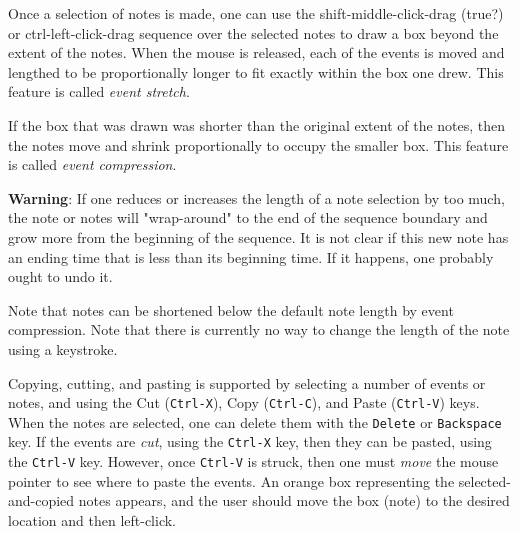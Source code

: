    Once a selection of notes is made, one can use the
   shift-middle-click-drag (true?) or ctrl-left-click-drag
   sequence over the selected notes to
   draw a box beyond the extent of the notes.  When the mouse is released,
   each of the events is moved and lengthed to be proportionally longer to
   fit exactly within the box one drew.
   This feature is called \textsl{event stretch}.

   If the box that was drawn was shorter than the original extent of the
   notes, then the notes move and shrink proportionally to occupy the
   smaller box.
   This feature is called \textsl{event compression}.
   
   \textbf{Warning}:  If one reduces or increases the length of a note selection
   by too much, the note or notes will "wrap-around" to the end of the sequence
   boundary and grow more from the beginning of the sequence. 
   It is not clear if this new note has an ending time that is less than its
   beginning time.  If it happens, one probably ought to undo it.

   Note that notes can be shortened below the default note length by event
   compression.  Note that there is currently no way to change the length of
   the note using a keystroke.

   Copying, cutting, and pasting is supported by selecting a number of events
   or notes, and using the
    Cut (\texttt{Ctrl-X}), 
    Copy (\texttt{Ctrl-C}),
    and Paste (\texttt{Ctrl-V}) keys.
   When the notes are selected,
   one can delete them with the \texttt{Delete} or \texttt{Backspace} key.
   If the events are \textsl{cut}, using the \texttt{Ctrl-X} key, then
   they can be pasted, using the \texttt{Ctrl-V} key.  However,
   once \texttt{Ctrl-V} is struck, then one must \textsl{move} the mouse
   pointer to see where to paste the events.  An orange box representing the
   selected-and-copied notes appears, and the user should move the box (note)
   to the desired location and then left-click.

